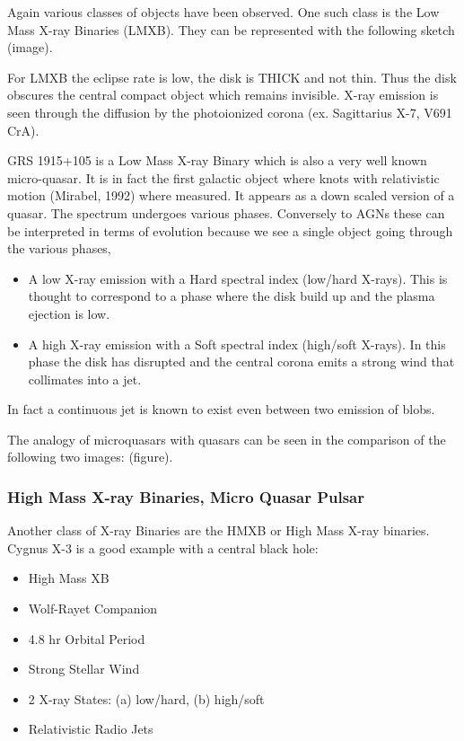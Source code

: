 \documentclass[10pt,a4paper,english]{article}
\begin{document}
Again various classes of objects have been observed. One such class is the Low Mass X-ray Binaries (LMXB). They can be represented with the following sketch (image).

For LMXB the eclipse rate is low, the disk is THICK and not thin. Thus the disk obscures the central compact object which remains invisible. X-ray emission is seen through the diffusion by the photoionized corona (ex. Sagittarius X-7, V691 CrA).

GRS 1915+105 is a Low Mass X-ray Binary which is also a very well known micro-quasar. It is in fact the first galactic object where knots with relativistic motion (Mirabel, 1992) where measured. It appears as a down scaled version of a quasar. The spectrum undergoes various phases. Conversely to AGNs these can be interpreted in terms of evolution because we see a single object going through the various phases,

\begin{itemize}
    \item A low X-ray emission with a Hard spectral index (low/hard X-rays). This is thought to correspond to a phase where the disk build up and the plasma ejection is low.
    \item A high X-ray emission with a Soft spectral index (high/soft X-rays). In this phase the disk has disrupted and the central corona emits a strong wind that collimates into a jet.
\end{itemize}

In fact a continuous jet is known to exist even between two emission of blobs.

The analogy of microquasars with quasars can be seen in the comparison of the following two images: (figure).

\subsubsection{High Mass X-ray Binaries, Micro Quasar Pulsar}
Another class of X-ray Binaries are the HMXB or High Mass X-ray binaries. Cygnus X-3 is a good example with a central black hole:
\begin{itemize}
    \item High Mass XB
    \item Wolf-Rayet Companion
    \item 4.8 hr Orbital Period
    \item Strong Stellar Wind
    \item 2 X-ray States: (a) low/hard, (b) high/soft
    \item Relativistic Radio Jets
\end{itemize}
\end{document}
